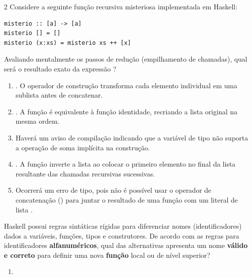 \documentclass[a4paper,10pt,brazil]{article}
\begin{document}
\begin{multicols}{2}
Considere a seguinte função recursiva misteriosa implementada em Haskell:

\begin{verbatim}
misterio :: [a] -> [a]
misterio [] = []
misterio (x:xs) = misterio xs ++ [x]
\end{verbatim}

Avaliando mentalmente os passos de redução (empilhamento de chamadas), qual será o resultado exato da expressão ?

\begin{enumerate}
  \item \haskellinline{[[1], [2], [3]]}. O operador de construção transforma cada elemento individual em uma sublista antes de concatenar.

  \item \haskellinline{[1, 2, 3]}. A função é equivalente à função identidade, recriando a lista original na mesma ordem.

  \item Haverá um aviso de compilação indicando que a variável de tipo  não suporta a operação de soma implícita na construção.

  \item \haskellinline{[3, 2, 1]}. A função inverte a lista ao colocar o primeiro elemento no final da lista resultante das chamadas recursivas sucessivas.

  \item Ocorrerá um erro de tipo, pois não é possível usar o operador de concatenação (\haskellinline{++}) para juntar o resultado de uma função com um literal de lista \haskellinline{[x]}.


\end{enumerate}

Haskell possui regras sintáticas rígidas para diferenciar nomes (identificadores) dados a variáveis, funções, tipos e construtores. De acordo com as regras para identificadores \textbf{alfanuméricos}, qual das alternativas apresenta um nome \textbf{válido e correto} para definir uma nova \textbf{função} local ou de nível superior?

\begin{enumerate}
  \item {}


\end{enumerate}
\end{multicols}
\end{document}
